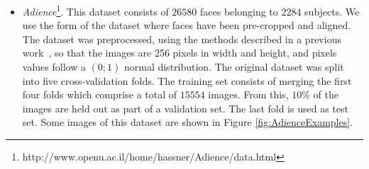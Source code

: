 \documentclass[journal]{IEEEtran}
\begin{document}
\begin{itemize}
		
		
		\item \textit{Adience}\footnote{http://www.openu.ac.il/home/hassner/Adience/data.html}. This dataset consists of $26580$ faces belonging to $2284$ subjects. We use the form of the dataset where faces have been pre-cropped and aligned. The dataset was preprocessed, using the methods described in a previous work~\cite{beckham2017unimodal}, so that the images are 256 pixels in width and height, and pixels values follow a $(0;1)$ normal distribution. The original dataset was split into five cross-validation folds. The training set consists of merging the first four folds which comprise a total of $15554$ images. From this, $10\%$ of the images are held out as part of a validation set. The last fold is used as test set. Some images of this dataset are shown in Figure \ref{fig:AdienceExamples}.
		

\end{itemize}
\end{document}
